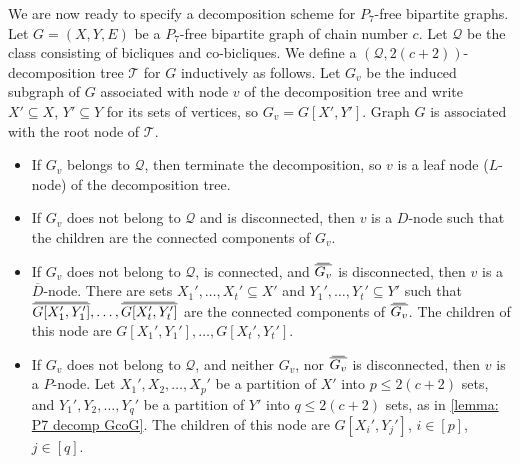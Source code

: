 \documentclass{article}
\newcommand{\cQ}{\ensuremath{\mathcal{Q}}}
\newcommand{\cT}{\ensuremath{\mathcal{T}}}
\newcommand\doverline[1]{%
  \setbox0=\hbox{$\!\overline{#1}\!$}%
  \ht0=\dimexpr\ht0-.2ex\relax%
  \,\overline{\copy0}\,%
}
\newcommand{\bc}[1]{\doverline{#1}} %
\begin{document}
We are now ready to specify a decomposition scheme for $P_7$-free bipartite graphs.
Let $G=(X,Y,E)$ be a $P_7$-free bipartite graph of chain number $c$.
Let $\cQ$ be the class consisting of bicliques and co-bicliques.
We define a $(\cQ,2(c+2))$-decomposition tree $\cT$ for $G$ inductively as follows. 
Let $G_v$ be the induced subgraph of $G$ associated with node $v$ of the decomposition tree and write $X' \subseteq X$, $Y' \subseteq Y$ for its sets of vertices, so $G_v = G[X',Y']$.
Graph $G$ is associated with the root node of $\cT$.
\begin{itemize}
	\item If $G_v$ belongs to $\cQ$, then terminate the decomposition, so $v$ is a leaf node ($L$-node) of the decomposition tree.
	
	\item If $G_v$ does not belong to $\cQ$ and is disconnected, then $v$ is a $D$-node such
	that the children are the connected components of $G_v$.
	
	\item If $G_v$ does not belong to $\cQ$, is connected, and $\bc{G_v}$ is disconnected,
	then $v$ is a $\overline D$-node.
	There are sets $X_1', \dotsc, X_t' \subseteq X'$ and $Y_1', \dotsc, Y_t' \subseteq Y'$ 
	such that $\bc{G[X_1',Y_1']}, \dotsc,  \bc{G[X_t',Y_t']}$ 
	are the connected components of $\bc{G_v}$. 
	The children of this node are $G[X_1',Y_1'], \dotsc, G[X_t',Y_t']$.
	
	\item If $G_v$ does not belong to $\cQ$, and neither $G_v$, nor $\bc{G_v}$ is disconnected,
	then $v$ is a $P$-node.
	Let $X_1', X_2, \ldots, X_p'$ be a partition of $X'$ into $p \leq 2(c+2)$ sets,
	and $Y_1', Y_2, \ldots, Y_q'$ be a partition of $Y'$ into $q \leq 2(c+2)$ sets,
	as in \cref{lemma: P7 decomp GcoG}.
	The children of this node are $G[X_i',Y_j']$, $i \in[p]$, $j \in [q]$.
\end{itemize}
\end{document}
